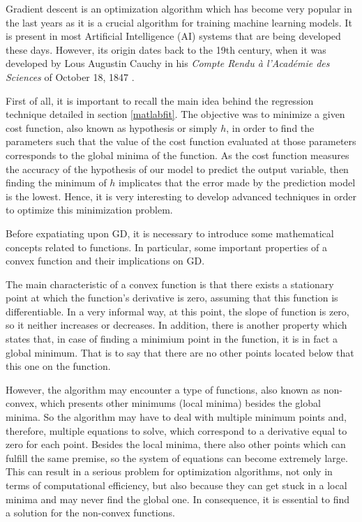 \documentclass[a4paper, report, oneside, UKenglish]{memoir}
\begin{document}
Gradient descent is an optimization algorithm which has become very popular in the last years as it is a crucial algorithm for training machine learning models. It is present in most Artificial Intelligence (AI) systems that are being developed these days. However, its origin dates back to the 19th century, when it was developed by Lous Augustin Cauchy in his \textit{Compte Rendu à l’Académie des Sciences} of October 18, 1847 \cite{cauchy}.

First of all, it is important to recall the main idea behind the regression technique detailed in section \ref{matlabfit}. The objective was to minimize a given cost function, also known as hypothesis or simply $h$, in order to find the parameters such that the value of the cost function evaluated at those parameters corresponds to the global minima of the function. As the cost function measures the accuracy of the hypothesis of our model to predict the output variable, then finding the minimum of $h$ implicates that the error made by the prediction model is the lowest. Hence, it is very interesting to develop advanced techniques in order to optimize this minimization problem. 

Before expatiating upon GD, it is necessary to introduce some mathematical concepts related to functions. In particular, some important properties of a convex function and their implications on GD. 

The main characteristic of a convex function is that there exists a stationary point at which the function's derivative is zero, assuming that this function is differentiable. In a very informal way, at this point, the slope of function is zero, so it neither increases or decreases. In addition, there is another property which states that, in case of finding a minimium point in the function, it is in fact a global minimum. That is to say that there are no other points located below that this one on the function. 

However, the algorithm may encounter a type of functions, also known as non-convex, which presents other minimums (local minima) besides the global minima. So the algorithm may have to deal with multiple minimum points and, therefore, multiple equations to solve, which correspond to a derivative equal to zero for each point. Besides the local minima, there also other points which can fulfill the same premise, so the system of equations can become extremely large. This can result in a serious problem for optimization algorithms, not only in terms of computational efficiency, but also because they can get stuck in a local minima and may never find the global one. In consequence, it is essential to find a solution for the non-convex functions. 
\end{document}
